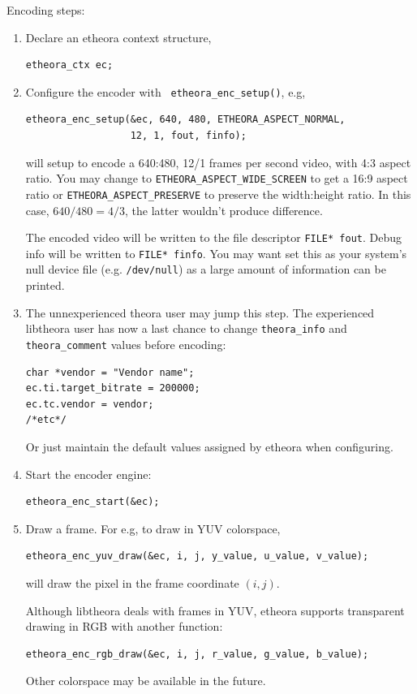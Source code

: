 \documentclass{article}
\begin{document}
Encoding steps: 
\begin{enumerate}
\item Declare an etheora context structure, 
\begin{verbatim}
etheora_ctx ec;
\end{verbatim}

\item Configure the encoder with \texttt{ etheora\_enc\_setup()}, e.g, 
\begin{verbatim}
etheora_enc_setup(&ec, 640, 480, ETHEORA_ASPECT_NORMAL, 
                  12, 1, fout, finfo);
\end{verbatim}
will setup to encode a 640:480, 12/1 frames per second video, with 4:3 
aspect ratio. You may change to \texttt{ETHEORA\_ASPECT\_WIDE\_SCREEN} 
to get a 16:9 aspect ratio or \texttt{ETHEORA\_ASPECT\_PRESERVE} to 
preserve the width:height ratio. In this case, $640/480 = 4/3$, the 
latter wouldn't produce difference. 

The encoded video will be written to the file descriptor 
\texttt{FILE* fout}. Debug info will be written to \texttt{FILE*
finfo}. You may want set this as your system's null device file (e.g.
\texttt{/dev/null}) as a large amount of information  can be printed. 

\item The unnexperienced theora user may jump this step. The experienced 
libtheora user has now a last chance to change \texttt{theora\_info} and
\texttt{theora\_comment} values before encoding:
\begin{verbatim}
char *vendor = "Vendor name"; 
ec.ti.target_bitrate = 200000; 
ec.tc.vendor = vendor;
/*etc*/
\end{verbatim}
Or just maintain the default values assigned by etheora when
configuring. 

\item Start the encoder engine: 
\begin{verbatim}
etheora_enc_start(&ec); 
\end{verbatim}

\item Draw a frame. For e.g, to draw in YUV colorspace, 
\begin{verbatim}
etheora_enc_yuv_draw(&ec, i, j, y_value, u_value, v_value);
\end{verbatim}
will draw the pixel in the frame coordinate $(i,j)$. 

Although libtheora deals with frames in YUV, etheora supports 
transparent drawing in RGB with another function: 
\begin{verbatim}
etheora_enc_rgb_draw(&ec, i, j, r_value, g_value, b_value);
\end{verbatim}
Other colorspace may be available in the future. 


\end{enumerate}
\end{document}
